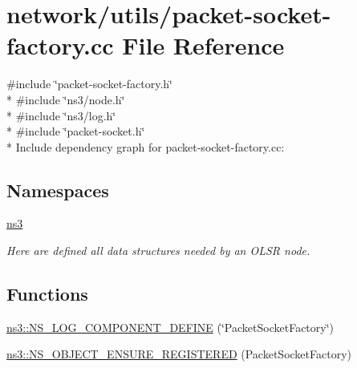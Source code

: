 \hypertarget{packet-socket-factory_8cc}{}\section{network/utils/packet-\/socket-\/factory.cc File Reference}
\label{packet-socket-factory_8cc}
{\ttfamily \#include \char`\"{}packet-\/socket-\/factory.\+h\char`\"{}}\\*
{\ttfamily \#include \char`\"{}ns3/node.\+h\char`\"{}}\\*
{\ttfamily \#include \char`\"{}ns3/log.\+h\char`\"{}}\\*
{\ttfamily \#include \char`\"{}packet-\/socket.\+h\char`\"{}}\\*
Include dependency graph for packet-\/socket-\/factory.cc\+:
\subsection*{Namespaces}
\begin{DoxyCompactItemize}
\item 
 \hyperlink{namespacens3}{ns3}
\begin{DoxyCompactList}\small\item\em Here are defined all data structures needed by an O\+L\+SR node. \end{DoxyCompactList}\end{DoxyCompactItemize}
\subsection*{Functions}
\begin{DoxyCompactItemize}
\item 
\hyperlink{namespacens3_a5ba0d5b83acce924875066b705239ed7}{ns3\+::\+N\+S\+\_\+\+L\+O\+G\+\_\+\+C\+O\+M\+P\+O\+N\+E\+N\+T\+\_\+\+D\+E\+F\+I\+NE} (\char`\"{}Packet\+Socket\+Factory\char`\"{})
\item 
\hyperlink{namespacens3_a5686d5a91bae5b14b80778e660941a07}{ns3\+::\+N\+S\+\_\+\+O\+B\+J\+E\+C\+T\+\_\+\+E\+N\+S\+U\+R\+E\+\_\+\+R\+E\+G\+I\+S\+T\+E\+R\+ED} (Packet\+Socket\+Factory)
\end{DoxyCompactItemize}
